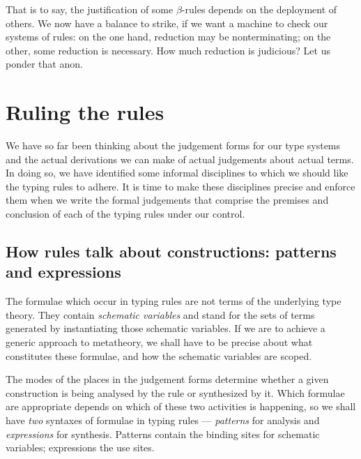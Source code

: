 \documentclass{jfp1}
\begin{document}
That is to say, the justification of some $\beta$-rules depends on the
deployment of others. We now have a balance to strike, if we want a
machine to check our systems of rules: on the one hand, reduction may
be nonterminating; on the other, some reduction is necessary. How much
reduction is judicious? Let us ponder that anon.


\section{Ruling the rules}

We have so far been thinking about the judgement forms for our type
systems and the actual derivations we can make of actual judgements
about actual terms. In doing so, we have identified some informal
disciplines to which we should like the typing rules to adhere. It is
time to make these disciplines precise and enforce them when we write
the formal judgements that comprise the premises and conclusion of
each of the typing rules under our control.


\subsection{How rules talk about constructions: patterns and expressions}

The formulae which occur in typing rules are not terms of the underlying
type theory. They contain \emph{schematic variables} and stand for the sets
of terms generated by instantiating those schematic variables. If we are
to achieve a generic approach to metatheory, we shall have to be precise
about what constitutes these formulae, and how the schematic variables are
scoped.

The modes of the places in the judgement forms determine whether a given
construction is being analysed by the rule or synthesized by it. Which formulae
are appropriate depends on which of these two activities is happening, so
we shall have \emph{two} syntaxes of formulae in typing rules --- \emph{patterns}
for analysis and \emph{expressions} for synthesis. Patterns contain the
binding sites for schematic variables; expressions the use sites.
\end{document}
